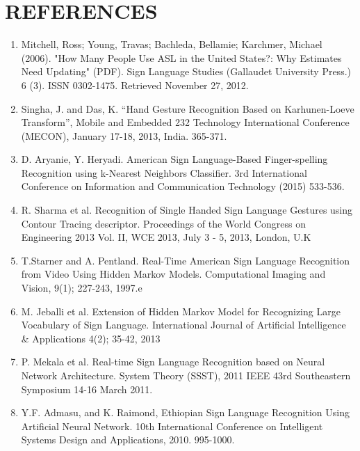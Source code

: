 \chapter*{\rm \large \bf REFERENCES}
\vspace{4.0mm}
\setlength{\parindent}{1cm} 

\scriptsize{}
\begin{enumerate}
    \item Mitchell, Ross; Young, Travas; Bachleda, Bellamie;
Karchmer, Michael (2006). "How Many People Use ASL in
the United States?: Why Estimates Need Updating" (PDF).
Sign Language Studies (Gallaudet University Press.) 6 (3).
ISSN 0302-1475. Retrieved November 27, 2012.

    \item Singha, J. and Das, K. “Hand Gesture Recognition Based on
Karhunen-Loeve Transform”, Mobile and Embedded
232
Technology International Conference (MECON), January
17-18, 2013, India. 365-371.

    \item D. Aryanie, Y. Heryadi. American Sign Language-Based
Finger-spelling Recognition using k-Nearest Neighbors
Classifier. 3rd International Conference on Information and
Communication Technology (2015) 533-536.

    \item R. Sharma et al. Recognition of Single Handed Sign
Language Gestures using Contour Tracing descriptor.
Proceedings of the World Congress on Engineering 2013
Vol. II, WCE 2013, July 3 - 5, 2013, London, U.K

    \item T.Starner and A. Pentland. Real-Time American Sign
Language Recognition from Video Using Hidden
Markov Models. Computational Imaging and Vision, 9(1);
227-243, 1997.e

    \item M. Jeballi et al. Extension of Hidden Markov Model for
Recognizing Large Vocabulary of Sign Language.
International Journal of Artificial Intelligence &
Applications 4(2); 35-42, 2013

    \item P. Mekala et al. Real-time Sign Language Recognition
based on Neural Network Architecture. System Theory
(SSST), 2011 IEEE 43rd Southeastern Symposium 14-16
March 2011.

    \item Y.F. Admasu, and K. Raimond, Ethiopian Sign Language
Recognition Using Artificial Neural Network. 10th
International Conference on Intelligent Systems Design and
Applications, 2010. 995-1000.


\end{enumerate}
